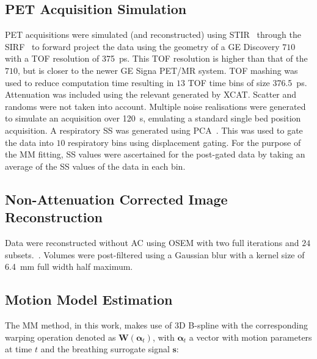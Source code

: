     
    \subsection{PET Acquisition Simulation} \label{sec:pet_acquisition_simulation}
        \gls{PET} acquisitions were simulated (and reconstructed) using \gls{STIR}~\cite{Thielemans2012, Nikos2019, Wadhwa2020PETLibrary} through the \gls{SIRF}~\cite{Ovtchinnikov2017} to forward project the data using the geometry of a \gls{GE} Discovery $710$ with a \gls{TOF} resolution of \SI{375}{\pico\second}. This \gls{TOF} resolution is higher than that of the $710$, but is closer to the newer \gls{GE} Signa \gls{PET}/MR system. \gls{TOF} mashing was used to reduce computation time resulting in $13$ \gls{TOF} time bins of size \SI{376.5}{\pico\second}. Attenuation was included using the relevant  generated by \gls{XCAT}. Scatter and randoms were not taken into account. Multiple noise realisations were generated to simulate an acquisition over \SI{120}{\second}, emulating a standard single bed position acquisition. A respiratory \gls{SS} was generated using \gls{PCA}~\cite{Thielemans2011}. This was used to gate the data into $10$ respiratory bins using displacement gating. For the purpose of the \gls{MM} fitting, \gls{SS} values were ascertained for the post-gated data by taking an average of the \gls{SS} values of the data in each bin.
    
    
    \subsection{Non-Attenuation Corrected Image Reconstruction} \label{sec:non-attenuation_corrected_image_reconstruction}
        Data were reconstructed without \gls{AC} using OSEM with two full iterations and $24$ subsets.~\cite{Hudson1994}.
        Volumes were post-filtered using a Gaussian blur with a kernel size of \SI{6.4}{\milli\metre} full width half maximum.
    
    
    \subsection{Motion Model Estimation} \label{sec:motion_model_estimation}
        The \gls{MM} method, in this work, makes use of \gls{3D} B-spline  with the corresponding warping operation denoted as $\mathbf{W}(\mathbf{\alpha}_t)$, with $\mathbf{\alpha}_t$ a vector with motion parameters at time $t$ and the breathing surrogate signal $\mathbf{s}$:
    
